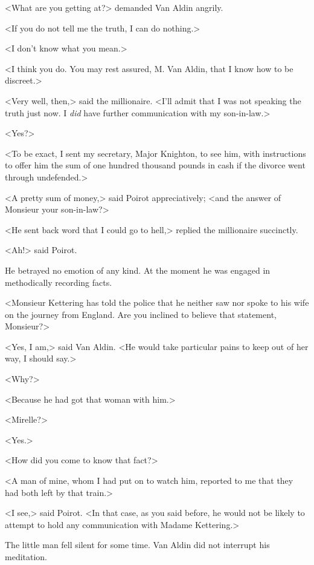 <What are you getting at?> demanded Van Aldin angrily.

<If you do not tell me the truth, I can do nothing.>

<I don't know what you mean.>

<I think you do. You may rest assured, M. Van Aldin, that I know how to be discreet.>

<Very well, then,> said the millionaire. <I'll admit that I was not speaking the truth just now. I \emph{did} have further communication with my son-in-law.>

<Yes?>

<To be exact, I sent my secretary, Major Knighton, to see him, with instructions to offer him the sum of one hundred thousand pounds in cash if the divorce went through undefended.>

<A pretty sum of money,> said Poirot appreciatively; <and the answer of Monsieur your son-in-law?>

<He sent back word that I could go to hell,> replied the millionaire succinctly.

<Ah!> said Poirot.

He betrayed no emotion of any kind. At the moment he was engaged in methodically recording facts.

<Monsieur Kettering has told the police that he neither saw nor spoke to his wife on the journey from England. Are you inclined to believe that statement, Monsieur?>

<Yes, I am,> said Van Aldin. <He would take particular pains to keep out of her way, I should say.>

<Why?>

<Because he had got that woman with him.>

<Mirelle?>

<Yes.>

<How did you come to know that fact?>

<A man of mine, whom I had put on to watch him, reported to me that they had both left by that train.>

<I see,> said Poirot. <In that case, as you said before, he would not be likely to attempt to hold any communication with Madame Kettering.>

The little man fell silent for some time. Van Aldin did not interrupt his meditation.